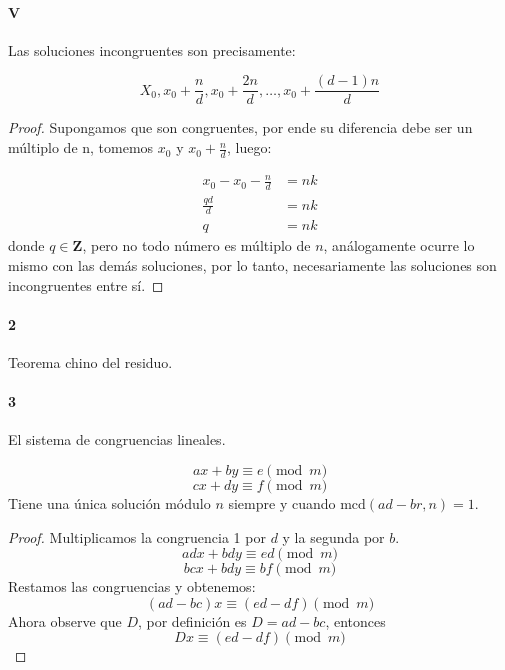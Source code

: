\documentclass{article}
\begin{document}
\paragraph{V} Las soluciones incongruentes son precisamente:

$$X_0, x_0 + \frac{n}{d}, x_0 + \frac{2n}{d}, \dots, x_0 + \frac{(d-1)n}{d}$$

\begin{proof}
Supongamos que son congruentes, por ende su diferencia debe ser un múltiplo de n, tomemos $x_0$ y $x_0 + \frac{n}{d}$, luego:

\begin{align*}
    x_0 - x_0 - \frac{n}{d} &= nk\\
    \frac{qd}{d} &= nk\\
    q &= nk
\end{align*}
donde $q \in \mathbf{Z}$, pero no todo número es múltiplo de $n$, análogamente ocurre lo mismo con las demás soluciones, por lo tanto, necesariamente las soluciones son incongruentes entre sí.
\end{proof}

\paragraph{2} Teorema chino del residuo.

\paragraph{3} El sistema de congruencias lineales.

$$ax + by \equiv e \pmod{m}$$
$$cx + dy \equiv f \pmod{m}$$
Tiene una única solución módulo $n$ siempre y cuando $\text{mcd}(ad-br,n) = 1$.
\begin{proof}
Multiplicamos la congruencia 1 por $d$ y la segunda por $b$.
$$adx + bdy \equiv ed \pmod{m}$$
$$bcx + bdy \equiv bf \pmod{m}$$
Restamos las congruencias y obtenemos:
$$(ad - bc)x \equiv (ed - df) \pmod{m}$$
Ahora observe que $D$, por definición es $D=ad-bc$, entonces
$$Dx \equiv (ed - df) \pmod{m}$$
\end{proof}
\end{document}
